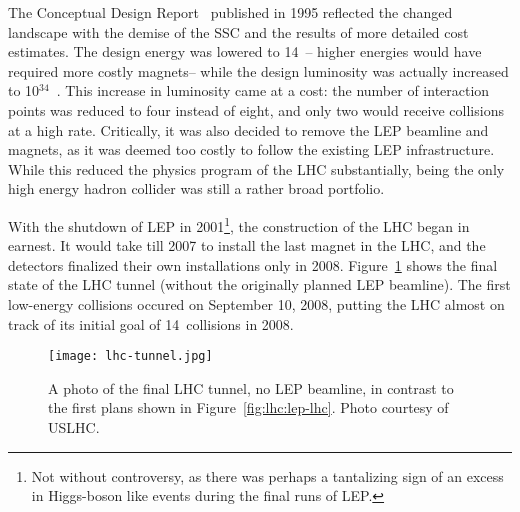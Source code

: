 The Conceptual Design Report~\cite{LHCCDR} published in 1995 reflected the changed landscape with the demise of the SSC and the results of more detailed cost estimates. The design energy was lowered to 14~\TeV-- higher energies would have required more costly magnets-- while the design luminosity was actually increased to 10$^{34}$~\lumirate. This increase in luminosity came at a cost: the number of interaction points was reduced to four instead of eight, and only two would receive collisions at a high rate.  Critically, it was also decided to remove the LEP beamline and magnets, as it was deemed too costly to follow the existing LEP infrastructure. While this reduced the physics program of the LHC substantially, being the only high energy hadron collider was still a rather broad portfolio.

With the shutdown of LEP in 2001\footnote{Not without controversy, as there was perhaps a tantalizing sign of an excess in Higgs-boson like events during the final runs of LEP.}, the construction of the LHC began in earnest. It would take till 2007 to install the last magnet in the LHC, and the detectors finalized their own installations only in 2008. Figure~\ref{fig:lhc:lhc-tunnel} shows the final state of the LHC tunnel (without the originally planned LEP beamline). The first low-energy collisions occured on September 10, 2008, putting the LHC almost on track of its initial goal of 14~\TeV collisions in 2008. 


\begin{figure}
\centering
\texttt{[image: lhc-tunnel.jpg]}
\label{fig:lhc:lhc-tunnel}
\caption{A photo of the final LHC tunnel, no LEP beamline, in contrast to the first plans shown in Figure~\ref{fig:lhc:lep-lhc}. Photo courtesy of USLHC.}
\end{figure}


